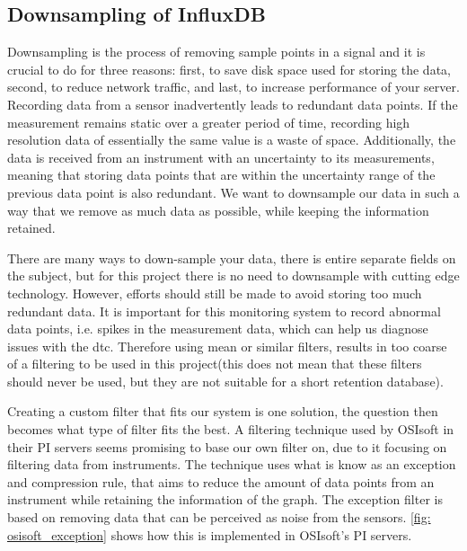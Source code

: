 \documentclass[main.tex]{subfiles}
\begin{document}
 
 
 \subsection{Downsampling of InfluxDB}
 \label{ssec: downsampling}

 Downsampling is the process of removing sample points in a signal and it is crucial to do for three reasons: first, to save disk space used for storing the data, second, to reduce network traffic, and last, to increase performance of your server. Recording data from a sensor inadvertently leads to redundant data points. If the measurement remains static over a greater period of time, recording high resolution data of essentially the same value is a waste of space. Additionally, the data is received from an instrument with an uncertainty to its measurements, meaning that storing data points that are within the uncertainty range of the previous data point is also redundant. We want to downsample our data in such a way that we remove as much data as possible, while keeping the information retained.
 
 There are many ways to down-sample your data, there is entire separate fields on the subject, but for this project there is no need to downsample with cutting edge technology. However, efforts should still be made to avoid storing too much redundant data. It is important for this monitoring system to record abnormal data points, i.e. spikes in the measurement data, which can help us diagnose issues with the \gls{dtc}. Therefore using mean or similar filters, results in too coarse of a filtering to be used in this project(this does not mean that these filters should never be used, but they are not suitable for a short retention database).
 
 Creating a custom filter that fits our system is one solution, the question then becomes what type of filter fits the best. A filtering technique used by OSIsoft in their PI servers seems promising to base our own filter on, due to it focusing on filtering data from instruments. The technique uses what is know as an exception and compression rule, that aims to reduce the amount of data points from an instrument while retaining the information of the graph. The exception filter is based on removing data that can be perceived as noise from the sensors. \autoref{fig: osisoft_exception} shows how this is implemented in OSIsoft's PI servers.
 
\end{document}
